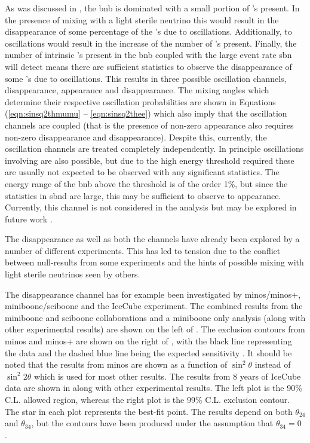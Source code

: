 As was discussed in , the \gls{bnb} is \numu dominated with a small portion of \nue's present. In the presence of mixing with a light sterile neutrino 
this would result in the disappearance of some percentage of the \numu's due to oscillations. Additionally, \numu to \nue oscillations would result in the increase of the number of \nue's present. Finally, the number of intrinsic \nue's present in the \gls{bnb} coupled with the large event rate \gls{sbn} will detect means there are sufficient statistics to observe the disappearance of some \nue's due to oscillations. This results in three possible oscillation channels, \numu disappearance, \nue appearance and \nue disappearance. The mixing angles which determine their respective oscillation probabilities are shown in Equations (\ref{eqn:sinsq2thmumu} -- \ref{eqn:sinsq2thee}) which also imply that the oscillation channels are coupled (that is the presence of non-zero \nue appearance also requires non-zero \numu disappearance and \nue disappearance). Despite this, currently, the oscillation channels are treated completely independently. In principle oscillations involving \nutau are also possible, but due to the high energy threshold required these are usually not expected to be observed with any significant statistics. The energy range of the \gls{bnb} above the \nutau threshold is of the order 1\%, but since the statistics in \gls{sbnd} are large, this may be sufficient to observe \numu to \nutau appearance. Currently, this channel is not considered in the analysis but may be explored in future work \cite{tau_oscillations}.

The \numu disappearance as well as both the \nue channels have already been explored by a number of different experiments. This has led to tension due to the conflict between null-results from some experiments and the hints of possible mixing with light sterile neutrinos seen by others. 

The \numu disappearance channel has for example been investigated by \gls{minos}/\gls{minos}+, \gls{miniboone}/\gls{sciboone} and the IceCube experiment. The combined results from the \gls{miniboone} and \gls{sciboone} collaborations and a \gls{miniboone} only analysis (along with other experimental results) are shown on the left of . The exclusion contours from \gls{minos} and \gls{minos}+ are shown on the right of , with the black line representing the data and the dashed blue line being the expected sensitivity \cite{MiniBooNE/SciBooNE_numu_disapp_contour} \cite{MINOS_numu_disapp_contour}. It should be noted that the results from \gls{minos} are shown as a function of $\sin^2{\theta}$ instead of $\sin^2{2\theta}$ which is used for most other results. The results from 8 years of IceCube data are shown in  along with other experimental results. The left plot is the 90\% C.L. allowed region, whereas the right plot is the 99\% C.L. exclusion contour. The star in each plot represents the best-fit point. The results depend on both $\theta_{24}$ and $\theta_{34}$, but the contours have been produced under the assumption that $\theta_{34} = 0$ \cite{IceCube_numu_disapp_contour}.

